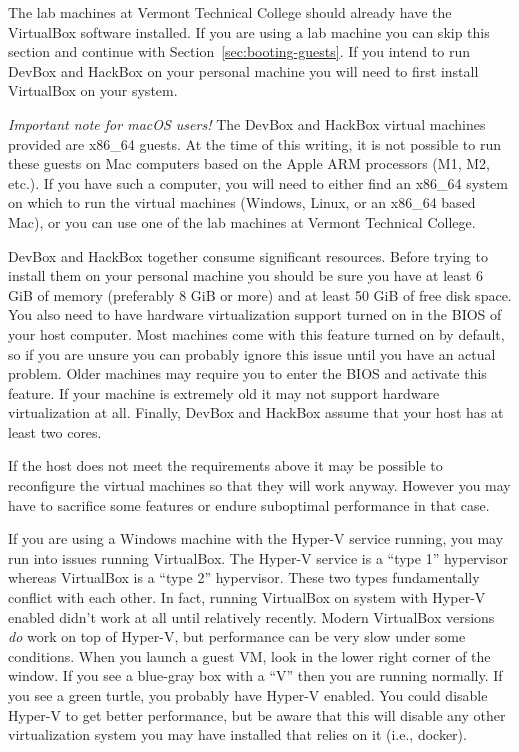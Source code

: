 \documentclass[twocolumn]{article}
\begin{document}
The lab machines at Vermont Technical College should already have the VirtualBox software
installed. If you are using a lab machine you can skip this section and continue with
Section~\ref{sec:booting-guests}. If you intend to run DevBox and HackBox on your personal
machine you will need to first install VirtualBox on your system.

\textit{Important note for macOS users!} The DevBox and HackBox virtual machines provided are
x86_64 guests. At the time of this writing, it is not possible to run these guests on Mac
computers based on the Apple ARM processors (M1, M2, etc.). If you have such a computer, you
will need to either find an x86_64 system on which to run the virtual machines (Windows, Linux,
or an x86_64 based Mac), or you can use one of the lab machines at Vermont Technical College.

DevBox and HackBox together consume significant resources. Before trying to install them on your
personal machine you should be sure you have at least 6 GiB of memory (preferably 8 GiB or more)
and at least 50 GiB of free disk space. You also need to have hardware virtualization support
turned on in the BIOS of your host computer. Most machines come with this feature turned on by
default, so if you are unsure you can probably ignore this issue until you have an actual
problem. Older machines may require you to enter the BIOS and activate this feature. If your
machine is extremely old it may not support hardware virtualization at all. Finally, DevBox and
HackBox assume that your host has at least two cores.

If the host does not meet the requirements above it may be possible to reconfigure the virtual
machines so that they will work anyway. However you may have to sacrifice some features or
endure suboptimal performance in that case.

If you are using a Windows machine with the Hyper-V service running, you may run into issues
running VirtualBox. The Hyper-V service is a ``type 1'' hypervisor whereas VirtualBox is a
``type 2'' hypervisor. These two types fundamentally conflict with each other. In fact, running
VirtualBox on system with Hyper-V enabled didn't work at all until relatively recently. Modern
VirtualBox versions \emph{do} work on top of Hyper-V, but performance can be very slow under
some conditions. When you launch a guest VM, look in the lower right corner of the window. If
you see a blue-gray box with a ``V'' then you are running normally. If you see a green turtle,
you probably have Hyper-V enabled. You could disable Hyper-V to get better performance, but be
aware that this will disable any other virtualization system you may have installed that relies
on it (i.e., docker).
\end{document}
